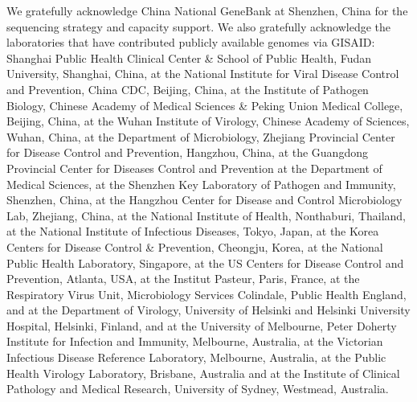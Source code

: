 \documentclass[9pt,lineno,onehalfspacing]{elife}
\begin{document}
We gratefully acknowledge China National GeneBank at Shenzhen, China for the sequencing strategy and capacity support. We also gratefully  acknowledge  the  laboratories  that  have  contributed  publicly  available  genomes  via GISAID: Shanghai Public Health Clinical Center \& School of Public Health, Fudan University, Shanghai, China, at the National Institute for Viral Disease Control and Prevention, China CDC, Beijing, China, at the  Institute  of  Pathogen  Biology,  Chinese  Academy  of  Medical  Sciences  \&  Peking  Union  Medical College,  Beijing,  China,  at  the  Wuhan  Institute  of  Virology,  Chinese  Academy  of  Sciences,  Wuhan, China,  at  the  Department  of  Microbiology,  Zhejiang  Provincial  Center  for  Disease  Control  and Prevention, Hangzhou, China, at the Guangdong Provincial Center for Diseases Control and Prevention at the Department of Medical Sciences, at the Shenzhen Key Laboratory of Pathogen and Immunity, Shenzhen, China, at the Hangzhou Center for Disease and Control Microbiology Lab, Zhejiang, China, at  the  National  Institute  of  Health,  Nonthaburi,  Thailand,  at  the  National  Institute  of  Infectious Diseases,  Tokyo, Japan, at the Korea Centers  for Disease  Control \&  Prevention, Cheongju, Korea, at the  National  Public  Health  Laboratory,  Singapore,  at  the  US  Centers  for  Disease  Control  and  Prevention,  Atlanta,  USA,  at  the  Institut  Pasteur,  Paris,  France,  at  the  Respiratory  Virus  Unit, Microbiology Services Colindale, Public Health England, and at the Department of Virology, University of  Helsinki  and  Helsinki  University  Hospital,  Helsinki,  Finland,  and  at  the  University  of  Melbourne, Peter Doherty Institute for Infection and Immunity, Melbourne, Australia, at the Victorian Infectious Disease  Reference  Laboratory,  Melbourne,  Australia,  at  the  Public  Health  Virology  Laboratory, Brisbane,  Australia  and  at  the  Institute  of  Clinical  Pathology  and  Medical  Research,  University  of Sydney, Westmead, Australia. 










\end{document}

